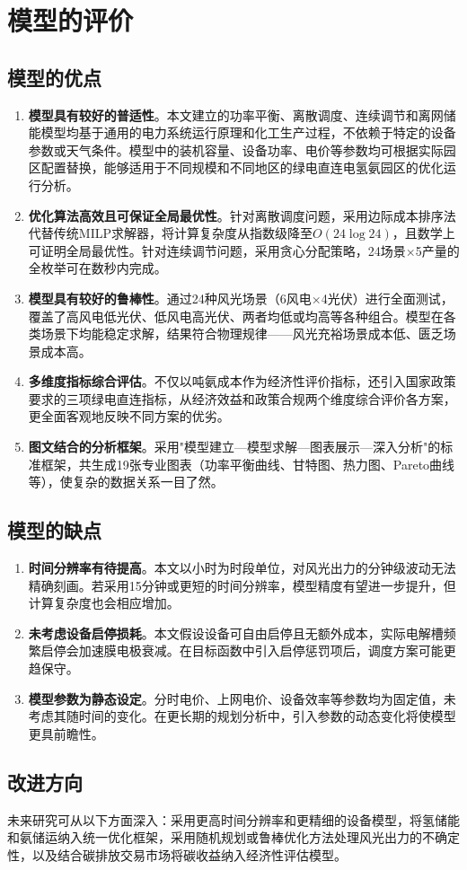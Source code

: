 \section{模型的评价}

\subsection{模型的优点}

\begin{enumerate}
    \item \textbf{模型具有较好的普适性}。本文建立的功率平衡、离散调度、连续调节和离网储能模型均基于通用的电力系统运行原理和化工生产过程，不依赖于特定的设备参数或天气条件。模型中的装机容量、设备功率、电价等参数均可根据实际园区配置替换，能够适用于不同规模和不同地区的绿电直连电氢氨园区的优化运行分析。

    \item \textbf{优化算法高效且可保证全局最优性}。针对离散调度问题，采用边际成本排序法代替传统MILP求解器，将计算复杂度从指数级降至$O(24\log 24)$，且数学上可证明全局最优性。针对连续调节问题，采用贪心分配策略，24场景$\times$5产量的全枚举可在数秒内完成。

    \item \textbf{模型具有较好的鲁棒性}。通过24种风光场景（6风电$\times$4光伏）进行全面测试，覆盖了高风电低光伏、低风电高光伏、两者均低或均高等各种组合。模型在各类场景下均能稳定求解，结果符合物理规律——风光充裕场景成本低、匮乏场景成本高。

    \item \textbf{多维度指标综合评估}。不仅以吨氨成本作为经济性评价指标，还引入国家政策要求的三项绿电直连指标，从经济效益和政策合规两个维度综合评价各方案，更全面客观地反映不同方案的优劣。

    \item \textbf{图文结合的分析框架}。采用"模型建立—模型求解—图表展示—深入分析"的标准框架，共生成19张专业图表（功率平衡曲线、甘特图、热力图、Pareto曲线等），使复杂的数据关系一目了然。
\end{enumerate}

\subsection{模型的缺点}

\begin{enumerate}
    \item \textbf{时间分辨率有待提高}。本文以小时为时段单位，对风光出力的分钟级波动无法精确刻画。若采用15分钟或更短的时间分辨率，模型精度有望进一步提升，但计算复杂度也会相应增加。

    \item \textbf{未考虑设备启停损耗}。本文假设设备可自由启停且无额外成本，实际电解槽频繁启停会加速膜电极衰减。在目标函数中引入启停惩罚项后，调度方案可能更趋保守。

    \item \textbf{模型参数为静态设定}。分时电价、上网电价、设备效率等参数均为固定值，未考虑其随时间的变化。在更长期的规划分析中，引入参数的动态变化将使模型更具前瞻性。
\end{enumerate}

\subsection{改进方向}

未来研究可从以下方面深入：采用更高时间分辨率和更精细的设备模型，将氢储能和氨储运纳入统一优化框架，采用随机规划或鲁棒优化方法处理风光出力的不确定性\cite{turner2022}，以及结合碳排放交易市场将碳收益纳入经济性评估模型。
